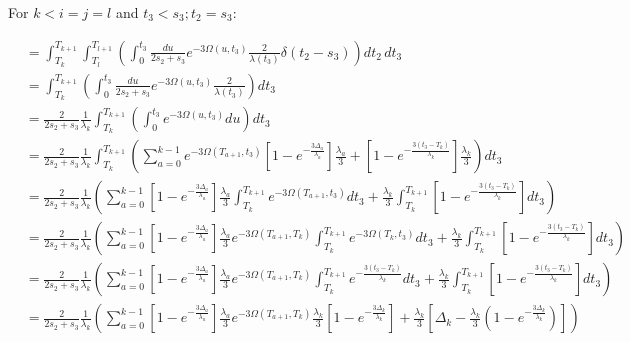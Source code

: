 \documentclass{article}
\begin{document}
For $k<i=j=l$ and $t_3<s_3;t_2=s_3$:

\begin{align*}
    &=\int_{T_k}^{T_{k+1}}\int_{T_l}^{T_{l+1}}\left(\int_0^{t_3}\frac{du}{2s_2+s_3}e^{-3\Omega(u,t_3)}\frac{2}{\lambda(t_3)}\delta(t_2-s_3)\right)dt_2\,dt_3\\
    &=\int_{T_k}^{T_{k+1}}\left(\int_0^{t_3}\frac{du}{2s_2+s_3}e^{-3\Omega(u,t_3)}\frac{2}{\lambda(t_3)}\right)dt_3\\
    &=\frac{2}{2s_2+s_3}\frac{1}{\lambda_k}\int_{T_k}^{T_{k+1}}\left(\int_0^{t_3}e^{-3\Omega(u,t_3)}du\right)dt_3\\
    &=\frac{2}{2s_2+s_3}\frac{1}{\lambda_k}\int_{T_k}^{T_{k+1}}\left(
    \sum_{a=0}^{k-1} e^{-3\Omega(T_{a+1},t_3)}
    \left[1-e^{-\frac{3 \Delta_a}{\lambda_a}}\right]\frac{\lambda_a}{3}+
    \left[1-e^{-\frac{3 \left(t_3-T_{k}\right)}{\lambda_{k}}}\right]\frac{\lambda_{k}}{3}\right)
    dt_3\\
    &=\frac{2}{2s_2+s_3}\frac{1}{\lambda_k}\left(
    \sum_{a=0}^{k-1} 
    \left[1-e^{-\frac{3 \Delta_a}{\lambda_a}}\right]\frac{\lambda_a}{3}
    \int_{T_k}^{T_{k+1}}e^{-3\Omega(T_{a+1},t_3)}dt_3+
    \frac{\lambda_{k}}{3}\int_{T_k}^{T_{k+1}}\left[1-e^{-\frac{3 \left(t_3-T_{k}\right)}{\lambda_{k}}}\right]dt_3\right)
    \\
    &=\frac{2}{2s_2+s_3}\frac{1}{\lambda_k}\left(
    \sum_{a=0}^{k-1} 
    \left[1-e^{-\frac{3 \Delta_a}{\lambda_a}}\right]\frac{\lambda_a}{3}
    e^{-3\Omega(T_{a+1},T_k)}\int_{T_k}^{T_{k+1}}e^{-3\Omega(T_k,t_3)}dt_3+
    \frac{\lambda_{k}}{3}\int_{T_k}^{T_{k+1}}\left[1-e^{-\frac{3 \left(t_3-T_{k}\right)}{\lambda_{k}}}\right]dt_3\right)
    \\
    &=\frac{2}{2s_2+s_3}\frac{1}{\lambda_k}\left(
    \sum_{a=0}^{k-1} 
    \left[1-e^{-\frac{3 \Delta_a}{\lambda_a}}\right]\frac{\lambda_a}{3}
    e^{-3\Omega(T_{a+1},T_k)}\int_{T_k}^{T_{k+1}}e^{-\frac{3(t_3-T_k)}{\lambda_k}}dt_3+
    \frac{\lambda_{k}}{3}\int_{T_k}^{T_{k+1}}\left[1-e^{-\frac{3 \left(t_3-T_{k}\right)}{\lambda_{k}}}\right]dt_3\right)
    \\
    &=\frac{2}{2s_2+s_3}\frac{1}{\lambda_k}\left(
    \sum_{a=0}^{k-1} 
    \left[1-e^{-\frac{3 \Delta_a}{\lambda_a}}\right]\frac{\lambda_a}{3}
    e^{-3\Omega(T_{a+1},T_k)}\frac{\lambda_k}{3}\left[1-e^{-\frac{3\Delta_k}{\lambda_k}}\right]+
    \frac{\lambda_{k}}{3}\left[\Delta_k-\frac{\lambda_k}{3}\left(1-e^{-\frac{3\Delta_k}{\lambda_k}}\right)\right]\right)
    \\
\end{align*}
\end{document}
